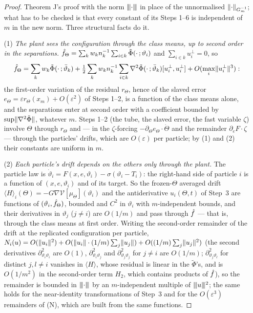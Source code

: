 \begin{proof}
Theorem J's proof with the norm $\lvert\kern-0.25ex\lvert\kern-0.25ex\lvert \cdot\rvert\kern-0.25ex\rvert\kern-0.25ex\rvert$ in place of the unnormalised $\lVert \cdot\rVert_{G_m^{-1}}$; what has to
be checked is that every constant of its Steps 1--6 is independent of $m$ in the new norm. Three structural facts do
it.

(1) \emph{The plant sees the configuration through the class means, up to second order in the separations.}
$\hat f_\Theta = \sum_kw_kn_k^{-1}\sum_{i\in k}\tilde\Phi(\cdot\,;\vartheta_i)$ and $\sum_{i\in k}u_i^\perp = 0$, so
\[
  \hat f_\Theta = \sum_kw_k\tilde\Phi(\cdot\,;\bar\vartheta_k)
  + \tfrac12\sum_kw_kn_k^{-1}\sum_{i\in k}\nabla^2\tilde\Phi(\cdot\,;\bar\vartheta_k)[u_i^\perp,u_i^\perp]
  + O(\max_i\lVert u_i^\perp\rVert^3):
\]
the first-order variation of the residual $r_\Theta$, hence of the slaved error
$e_\Theta = \varepsilon r_\Theta(x_m) + O(\varepsilon^2)$ of Steps 1--2, is a function of the class means alone, and
the separations enter at second order with a coefficient bounded by $\sup\lVert \nabla^2\tilde\Phi\rVert$, whatever $m$.
Steps 1--2 (the tube, the slaved error, the fast variable $\zeta$) involve $\Theta$ through $r_\Theta$ and --- in the
$\zeta$-forcing $-\partial_\Theta e_\Theta\cdot\dot\Theta$ and the remainder $\partial_eF\cdot\zeta$ --- through the
particles' drifts, which are $O(\varepsilon)$ per particle; by (1) and (2) their constants are uniform in $m$.

(2) \emph{Each particle's drift depends on the others only through the plant.} The particle law is
$\dot\vartheta_i = F(x,e,\vartheta_i) - \sigma(\vartheta_i - T_i)$: the right-hand side of particle $i$ is a function
of $(x,e,\vartheta_i)$ and of its target. So the frozen-$\Theta$ averaged drift
$\langle H\rangle_i(\Theta) = -G\nabla\mathcal{V}[\mu_\Theta](\vartheta_i)$ and the antiderivative $u_i(\Theta,t)$ of
Step~3 are functions of $(\vartheta_i,\hat f_\Theta)$, bounded and $C^2$ in $\vartheta_i$ with $m$-independent bounds,
and their derivatives in $\vartheta_j$ ($j\ne i$) are $O(1/m)$ and pass through $\hat f$ --- that is, through the class
means at first order. Writing the second-order remainder of the drift at the replicated configuration per particle,
$N_i(u) = O(\lVert u_i\rVert^2) + O(\lVert u_i\rVert\cdot(1/m)\sum_j\lVert u_j\rVert) + O((1/m)\sum_j\lVert u_j\rVert^2)$ (the second
derivatives $\partial^2_{\vartheta_i\vartheta_i}$ are $O(1)$, $\partial^2_{\vartheta_i\vartheta_j}$ and
$\partial^2_{\vartheta_j\vartheta_j}$ for $j\ne i$ are $O(1/m)$; $\partial^2_{\vartheta_j\vartheta_l}$ for distinct
$j,l\ne i$ vanishes in $\langle H\rangle$, whose residual is linear in the $\tilde\Phi$'s, and is $O(1/m^2)$ in the
second-order term $H_2$, which contains products of $\hat f$), so the remainder is bounded in $\lvert\kern-0.25ex\lvert\kern-0.25ex\lvert \cdot\rvert\kern-0.25ex\rvert\kern-0.25ex\rvert$ by an
$m$-independent multiple of $\lvert\kern-0.25ex\lvert\kern-0.25ex\lvert u\rvert\kern-0.25ex\rvert\kern-0.25ex\rvert^2$; the same holds for the near-identity transformations of Step~3 and for the
$O(\varepsilon^3)$ remainders of \textup{(N)}, which are built from the same functions.


\end{proof}
